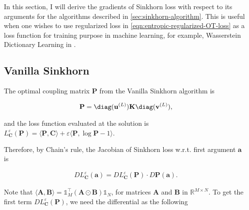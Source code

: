 
In this section, I will derive the gradients of Sinkhorn loss with respect to its arguments for the algorithms
described in \cref{sec:sinkhorn-algorithm}.
This is useful when one wishes to use regularized loss in \cref{eqn:entropic-regularized-OT-loss}
as a loss function for training purpose in machine learning, for example,
Wasserstein Dictionary Learning in .


\subsection{Vanilla Sinkhorn}\label{subsec:gradient-vanilla-sinkhorn}

The optimal coupling matrix $\mathbf{P}$ from the Vanilla Sinkhorn algorithm is

\begin{equation}\label{eqn:optimal-coupling-solution-from-sinkhorn}
  \begin{aligned}
    \mathbf{P} = \diag(\mathbf{u}^{(L)}) \mathbf{K} \diag(\mathbf{v}^{(L)}),
  \end{aligned}
\end{equation}

and the loss function evaluated at the solution is
$L_{\mathbf{C}}^\varepsilon(\mathbf{P}) =
  \langle \mathbf{P}, \mathbf{C}\rangle + \varepsilon\langle\mathbf{P}, \log \mathbf{P} - 1\rangle $.

Therefore, by Chain's rule, the Jacobian of Sinkhorn loss w.r.t. first argument $\mathbf{a}$ is

\begin{equation}\label{eqn:jacobian-loss-wrt-chainrule}
  \begin{aligned}
    D L_{\mathbf{C}}^\varepsilon(\mathbf{a})
    = D L_{\mathbf{C}}^\varepsilon(\mathbf{P}) \cdot D \mathbf{P}(\mathbf{a}).
  \end{aligned}
\end{equation}

Note that $\langle \mathbf{A}, \mathbf{B}\rangle = \mathbb{1}_M^\top \left(\mathbf{A}\odot \mathbf{B}\right) \mathbb{1}_N$,
for matrices $\mathbf{A}$ and $\mathbf{B}$ in $\mathbb{R}^{M\times N}$.
To get the first term $D L_{\mathbf{C}}^\varepsilon(\mathbf{P})$, we need the differential as the following

